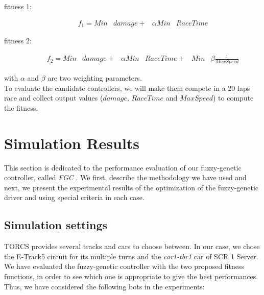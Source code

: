 \documentclass[runningheads,a4paper]{llncs}
\begin{document}
\begin{description}
	\item[fitness 1:]  
	\begin{equation} \label{fit1}
	\begin{array}{lllll}
	f_{1} =  Min & damage + &\alpha  Min & RaceTime 
	\end{array}
	\end{equation}
	\item[fitness 2:] 
	\begin{equation} \label{fit2}
	\begin{array}{llllll}
	f_{2}= Min & damage + &\alpha Min & RaceTime+ & Min & \beta \frac{1}{MaxSpeed}
	\end{array}
	\end{equation}	
\end{description}
with $\alpha$ and $\beta$ are two weighting parameters.\\
To evaluate the candidate controllers, we will make them compete in a 20 laps race and collect output values ($damage$, $RaceTime$ and $MaxSpeed$) to compute the fitness. 
  		
	
\section{Simulation Results}
	\label{sec:results}
	
This section is dedicated to the performance evaluation of our fuzzy-genetic controller, called \textit{FGC }.
	We first, describe the methodology we have used and next, we present the experimental results of the optimization of the fuzzy-genetic driver and using special criteria in each case.
	
	\subsection{Simulation settings}
	
	TORCS provides several tracks and cars to choose between. In our case, we chose the E-Track5 circuit for its multiple turns and the \textit{car1-tbr1} car of SCR 1 Server\cite{evo17}.\\
	We have evaluated the fuzzy-genetic controller with the two proposed fitness functions, in order to see which one is appropriate to give the best performances. Thus, we have considered the following bots in the experiments:
	
\end{document}
